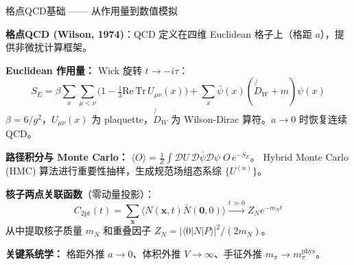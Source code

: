 \documentclass[10pt,aspectratio=169]{beamer}
\begin{document}
\begin{frame}{格点QCD基础 —— 从作用量到数值模拟}

  \textbf{格点QCD (Wilson, 1974)}：QCD 定义在四维 Euclidean 格子上（格距 $a$），提供非微扰计算框架。

  \textbf{Euclidean 作用量：} Wick 旋转 $t \to -i\tau$：
  \begin{equation*}
    S_E = \beta \sum_x \sum_{\mu<\nu} \bigl(1 - \tfrac{1}{3}\mathrm{Re}\,\mathrm{Tr}\,U_{\mu\nu}(x)\bigr)
         + \sum_x \bar{\psi}(x)(\not{D}_W + m)\psi(x)
  \end{equation*}
  $\beta = 6/g^2$，$U_{\mu\nu}(x)$ 为 plaquette，$\not{D}_W$ 为 Wilson-Dirac 算符。$a \to 0$ 时恢复连续 QCD。

  \textbf{路径积分与 Monte Carlo：}
  $\langle O \rangle = \frac{1}{Z} \int \mathcal{D}U\, \mathcal{D}\bar{\psi}\mathcal{D}\psi\; O\, e^{-S_E}$。
  Hybrid Monte Carlo (HMC) 算法进行重要性抽样，生成规范场组态系综 $\{U^{(n)}\}$。

  \textbf{核子两点关联函数}（零动量投影）：
  \begin{equation*}
    C_{2\mathrm{pt}}(t) = \sum_{\mathbf{x}} \big\langle N(\mathbf{x}, t) \bar{N}(\mathbf{0}, 0) \big\rangle
    \xrightarrow{t \gg 0} Z_N e^{-m_N t}
  \end{equation*}
  从中提取核子质量 $m_N$ 和重叠因子 $Z_N = |\langle 0|N|P\rangle|^2/(2m_N)$。

  \textbf{关键系统学：} 格距外推 $a \to 0$、体积外推 $V \to \infty$、手征外推 $m_\pi \to m_\pi^{\mathrm{phys}}$。\vspace{-4pt}
\end{frame}
\end{document}
